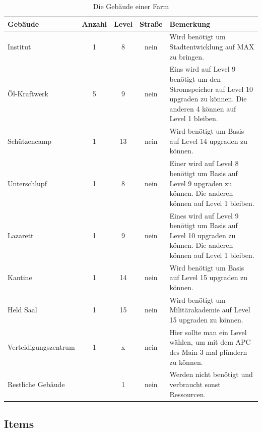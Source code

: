 \documentclass[fontsize=12pt,a4paper]{scrartcl}[2003/01/01]
\begin{document}
\begin{table}[h!]
  \centering
\begin{tabularx}{1.0\textwidth}{lcccX}
  Gebäude & Anzahl & Level & Straße & Bemerkung \\
  \hline
  Institut     & 1 & 8 & nein & Wird benötigt um Stadtentwicklung auf MAX zu bringen. \\
  Öl-Kraftwerk & 5 & 9 & nein & Eins wird auf Level 9 benötigt um den Stromspeicher auf Level 10 upgraden zu können. 
                                Die anderen 4 können auf Level 1 bleiben.\\
  Schützencamp & 1 & 13 & nein & Wird benötigt um Basis auf Level 14 upgraden zu können. \\
  Unterschlupf & 1 & 8 & nein & Einer wird auf Level 8 benötigt um Basis auf Level 9 upgraden zu können.
                                Die anderen können auf Level 1 bleiben.\\
  Lazarett     & 1 & 9 & nein & Eines wird auf Level 9 benötigt um Basis auf Level 10 upgraden zu können.
                            Die anderen können auf Level 1 bleiben.\\
  Kantine      & 1 & 14 & nein & Wird benötigt um Basis auf Level 15 upgraden zu können. \\
  Held Saal    & 1 & 15 & nein & Wird benötigt um Militärakademie auf Level 15 upgraden zu können. \\
  Verteidigungszentrum & 1 & x & nein & Hier sollte man ein Level wählen, um mit dem APC des Main 3 mal plündern zu können. \\
  Restliche Gebäude & ~ & 1 & nein & Werden nicht benötigt und verbraucht sonst Ressourcen. \\
\end{tabularx}
\caption[Gebäude]{Die Gebäude einer Farm}
\end{table}



\subsection{Items}
\end{document}
